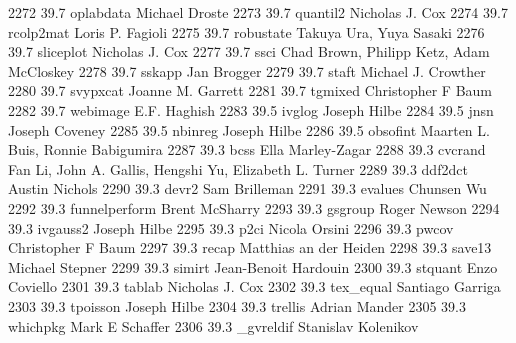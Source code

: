   2272     39.7    oplabdata     Michael Droste                          
  2273     39.7    quantil2      Nicholas J. Cox                         
  2274     39.7    rcolp2mat     Loris P. Fagioli                        
  2275     39.7    robustate     Takuya Ura, Yuya Sasaki                 
  2276     39.7    sliceplot     Nicholas J. Cox                         
  2277     39.7    ssci          Chad Brown, Philipp Ketz, Adam McCloskey
  2278     39.7    sskapp        Jan Brogger                             
  2279     39.7    staft         Michael J. Crowther                     
  2280     39.7    svypxcat      Joanne M. Garrett                       
  2281     39.7    tgmixed       Christopher F Baum                      
  2282     39.7    webimage      E.F. Haghish                            
  2283     39.5    ivglog        Joseph Hilbe                            
  2284     39.5    jnsn          Joseph Coveney                          
  2285     39.5    nbinreg       Joseph Hilbe                            
  2286     39.5    obsofint      Maarten L. Buis, Ronnie Babigumira      
  2287     39.3    bcss          Ella Marley-Zagar                       
  2288     39.3    cvcrand       Fan Li, John A. Gallis, Hengshi Yu,     
                                   Elizabeth L. Turner                     
  2289     39.3    ddf2dct       Austin Nichols                          
  2290     39.3    devr2         Sam Brilleman                           
  2291     39.3    evalues       Chunsen Wu                              
  2292     39.3    funnelperform  Brent McSharry                          
  2293     39.3    gsgroup       Roger Newson                            
  2294     39.3    ivgauss2      Joseph Hilbe                            
  2295     39.3    p2ci          Nicola Orsini                           
  2296     39.3    pwcov         Christopher F Baum                      
  2297     39.3    recap         Matthias an der Heiden                  
  2298     39.3    save13        Michael Stepner                         
  2299     39.3    simirt        Jean-Benoit Hardouin                    
  2300     39.3    stquant       Enzo Coviello                           
  2301     39.3    tablab        Nicholas J. Cox                         
  2302     39.3    tex_equal     Santiago Garriga                        
  2303     39.3    tpoisson      Joseph Hilbe                            
  2304     39.3    trellis       Adrian Mander                           
  2305     39.3    whichpkg      Mark E Schaffer                         
  2306     39.3    _gvreldif     Stanislav Kolenikov                     
